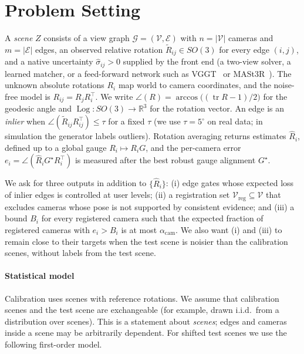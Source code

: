 \section{Problem Setting}\label{sec:setting}

A \emph{scene} $Z$ consists of a view graph $\mathcal{G}=(\mathcal{V},\mathcal{E})$ with $n=|\mathcal{V}|$ cameras and $m=|\mathcal{E}|$ edges, an observed relative rotation $\tilde R_{ij}\in SO(3)$ for every edge $(i,j)$, and a native uncertainty $\hat\sigma_{ij}>0$ supplied by the front end (a two-view solver, a learned matcher, or a feed-forward network such as VGGT~\cite{wang2025vggt} or MASt3R~\cite{leroy2024mast3r}). The unknown absolute rotations $R_i$ map world to camera coordinates, and the noise-free model is $R_{ij}=R_jR_i^{\top}$. We write $\angle(R)=\arccos\big((\operatorname{tr}R-1)/2\big)$ for the geodesic angle and $\operatorname{Log}:SO(3)\to\mathbb{R}^3$ for the rotation vector. An edge is an \emph{inlier} when $\angle(\tilde R_{ij}R_{ij}^{\top})\le\tau$ for a fixed $\tau$ (we use $\tau=5^\circ$ on real data; in simulation the generator labels outliers). Rotation averaging returns estimates $\hat R_i$, defined up to a global gauge $R_i\mapsto R_iG$, and the per-camera error $e_i=\angle(\hat R_i G^\star R_i^{\top})$ is measured after the best robust gauge alignment $G^\star$.

We ask for three outputs in addition to $\{\hat R_i\}$: (i) edge gates whose expected loss of inlier edges is controlled at user levels; (ii) a registration set $\mathcal{V}_{\mathrm{reg}}\subseteq\mathcal{V}$ that excludes cameras whose pose is not supported by consistent evidence; and (iii) a bound $B_i$ for every registered camera such that the expected fraction of registered cameras with $e_i>B_i$ is at most $\alpha_{\mathrm{cam}}$. We also want (i) and (iii) to remain close to their targets when the test scene is noisier than the calibration scenes, without labels from the test scene.

\paragraph*{Statistical model} Calibration uses scenes with reference rotations. We assume that calibration scenes and the test scene are exchangeable (for example, drawn i.i.d.\ from a distribution over scenes). This is a statement about \emph{scenes}; edges and cameras inside a scene may be arbitrarily dependent. For shifted test scenes we use the following first-order model.

